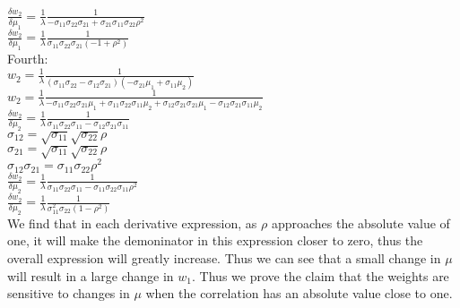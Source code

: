 \documentclass[11pt]{article}
\begin{document}
$\frac{\delta w_{2}}{\delta \mu_{1}} = \frac{1}{\lambda} \frac{1}{-\sigma_{11}\sigma_{22}\sigma_{21} + \sigma_{21}\sigma_{11} \sigma_{22} \rho^{2}}$\\
$\frac{\delta w_{2}}{\delta \mu_{1}} = \frac{1}{\lambda} \frac{1}{\sigma_{11}\sigma_{22}\sigma_{21} (-1 + \rho^{2})}$\\

Fourth:\\
$w_{2} = \frac{1}{\lambda} \frac{1}{(\sigma_{11}\sigma_{22} - \sigma_{12}\sigma_{21})(-\sigma_{21} \mu_{1} + \sigma_{11} \mu_{2})}$\\
$w_{2} = \frac{1}{\lambda} \frac{1}{-\sigma_{11}\sigma_{22}\sigma_{21}\mu_{1} + \sigma_{11}\sigma_{22}\sigma_{11}\mu_{2} + \sigma_{12}\sigma_{21}\sigma_{21}\mu_{1} - \sigma_{12}\sigma_{21}\sigma_{11}\mu_{2}}$\\
$\frac{\delta w_{2}}{\delta \mu_{2}} = \frac{1}{\lambda} \frac{1}{\sigma_{11}\sigma_{22}\sigma_{11} - \sigma_{12}\sigma_{21}\sigma_{11}}$\\

$\sigma_{12} = \sqrt{\sigma_{11}} \sqrt{\sigma_{22}} \rho$\\
$\sigma_{21} = \sqrt{\sigma_{11}} \sqrt{\sigma_{22}} \rho$\\
$\sigma_{12} \sigma_{21} = \sigma_{11} \sigma_{22} \rho^{2}$\\

$\frac{\delta w_{2}}{\delta \mu_{2}} = \frac{1}{\lambda} \frac{1}{\sigma_{11}\sigma_{22}\sigma_{11} - \sigma_{11} \sigma_{22} \sigma_{11} \rho^{2}}$\\
$\frac{\delta w_{2}}{\delta \mu_{2}} = \frac{1}{\lambda} \frac{1}{\sigma_{11}^{2}\sigma_{22} (1 - \rho^{2})}$\\

We find that in each derivative expression, as $\rho$ approaches the absolute value of one, it will make the demoninator in this expression closer to zero, thus the overall expression will greatly increase. Thus we can see that a small change in $\mu$ will result in a large change in $w_{1}$. Thus we prove the claim that the weights are sensitive to changes in $\mu$ when the correlation has an absolute value close to one.\\
\end{document}
